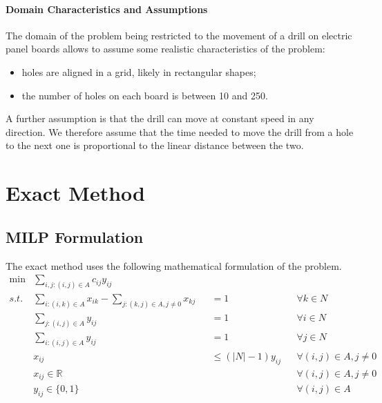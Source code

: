 \documentclass{article}
\begin{document}
\paragraph{Domain Characteristics and Assumptions}
The domain of the problem being restricted to the movement of a drill on electric panel boards allows to assume some realistic characteristics of the problem:
\begin{itemize}
    \item holes are aligned in a grid, likely in rectangular shapes;
    \item the number of holes on each board is between 10 and 250.
\end{itemize}
A further assumption is that the drill can move at constant speed in any direction.
We therefore assume that the time needed to move the drill from a hole to the next one is proportional to the linear distance between the two.

\section{Exact Method}

\subsection{MILP Formulation}
The exact method uses the following mathematical formulation of the problem.
\begin{align}
    \min & \sum_{i,j : (i,j) \in A} c_{i j} y_{i j}                                                                                                 \\
    \label{MILP:consume}
    s.t. & \sum_{i : (i,k) \in A} x_{i k} - \sum_{j : (k,j) \in A, j \neq 0} x_{k j} &  & = 1                    &  & \forall k \in N               \\
    \label{MILP:output}
         & \sum_{j : (i,j) \in A} y_{i j}                                            &  & = 1                    &  & \forall i \in N               \\
    \label{MILP:input}
         & \sum_{i : (i,j) \in A} y_{i j}                                            &  & = 1                    &  & \forall j \in N               \\
    \label{MILP:activation}
         & x_{i j}                                                                   &  & \leq (|N| - 1) y_{i j} &  & \forall (i,j) \in A, j \neq 0 \\
         & x_{i j} \in \mathbb{R}                                                    &  &                        &  & \forall (i,j) \in A, j \neq 0 \\
         & y_{i j} \in \{0, 1\}                                                      &  &                        &  & \forall (i,j) \in A
\end{align}
\end{document}
